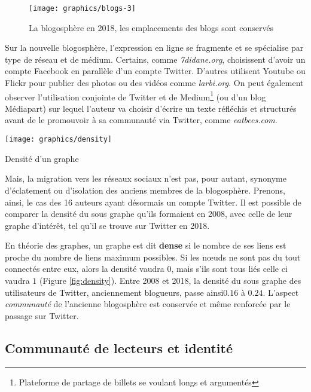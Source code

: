 \documentclass[symmetric,justified,marginals=raggedouter]{tufte-book}
\begin{document}
\newpage

\begin{figure*}
  \texttt{[image: graphics/blogs-3]}
  \caption{La blogosphère en 2018, les emplacements des blogs sont conservés}
  \label{fig:blogs-3}
\end{figure*} 

\noindent Sur la nouvelle blogosphère, l'expression en ligne se fragmente et se spécialise par type de réseau et de médium. Certains, comme \textit{7didane.org}, choisissent d'avoir un compte Facebook en parallèle d'un compte Twitter. D'autres utilisent Youtube ou Flickr pour publier des photos ou des vidéos comme \textit{larbi.org}. On peut également observer l'utilisation conjointe de Twitter et de Medium\footnote{Plateforme de partage de billets se voulant longs et argumentés} (ou d'un blog Médiapart) sur lequel l'auteur va choisir d'écrire un texte réfléchis et structurés avant de le promouvoir à sa communauté via Twitter, comme \textit{eatbees.com}. 

\begin{marginfigure}%
  \texttt{[image: graphics/density]}
  \vspace*{0.2cm}  
  \caption{Densité d'un graphe}
  \label{fig:density}
\end{marginfigure}

Mais, la migration vers les réseaux sociaux n'est pas, pour autant, synonyme d'éclatement ou d'isolation des anciens membres de la blogosphère. Prenons, ainsi, le cas des 16 auteurs ayant désormais un compte Twitter. Il est possible de comparer la densité du sous graphe qu'ils formaient en 2008, avec celle de leur graphe d'intérêt, tel qu'il se trouve sur Twitter en 2018. 

En théorie des graphes, un graphe est dit \textbf{dense} si le nombre de ses liens est proche du nombre de liens maximum possibles. Si les nœuds ne sont pas du tout connectés entre eux, alors la densité vaudra $0$, mais s'ils sont tous liés celle ci vaudra $1$ (Figure \ref{fig:density}). Entre 2008 et 2018, la densité du sous graphe des utilisateurs de Twitter, anciennement blogueurs, passe  ainsi$0.16$ à $0.24$. L'aspect \textit{communauté} de l'ancienne blogosphère est conservée et même renforcée par le passage sur Twitter.

\subsection{Communauté de lecteurs et identité}
\end{document}
